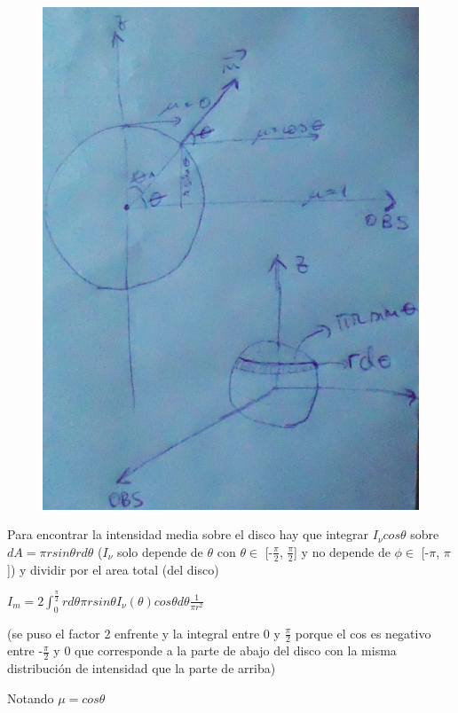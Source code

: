 \documentclass[10pt]{book}
\begin{document}
\begin{figure}[!ht]
 \centering
 \includegraphics[scale=0.2]{p2s.png}
\end{figure}


Para encontrar la intensidad media sobre el disco hay que integrar $I_{\nu} cos \theta$ sobre $dA = \pi r sin \theta r d\theta$ 
($I_{\nu}$ solo depende de $\theta$ con $\theta \in$ [-$\frac{\pi}{2}$, $\frac{\pi}{2}$] y
no depende de $\phi \in$ [-$\pi$, $\pi$]) y dividir por el area total (del disco)  

$I_m = 2 \int_{0}^{\frac{\pi}{2}} {r d\theta \pi r sin \theta I_{\nu}(\theta) cos \theta d\theta} \frac{1}{\pi r^2}$

(se puso el factor 2 enfrente y la integral entre 0 y $\frac{\pi}{2}$ porque el cos es negativo entre -$\frac{\pi}{2}$ y 0 que corresponde
 a la parte de abajo del disco con la misma distribución de intensidad que la parte de arriba)

Notando $\mu = cos \theta$
\end{document}
